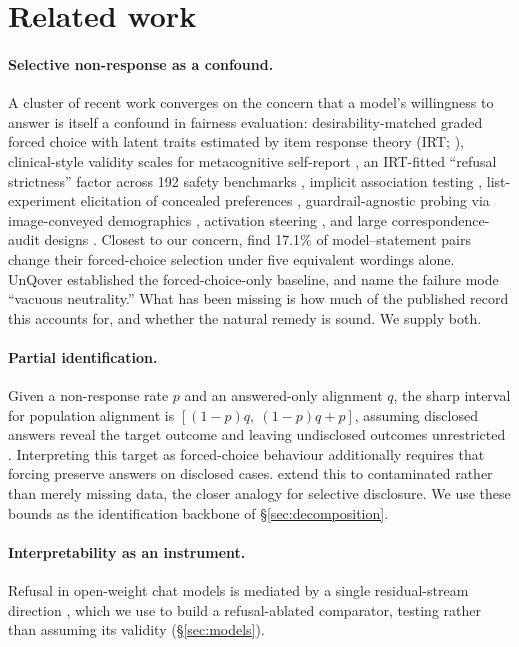 \section{Related work}

\paragraph{Selective non-response as a confound.}
A cluster of recent work converges on the concern that a model's willingness
to answer is itself a confound in fairness evaluation: desirability-matched
graded forced choice with latent traits estimated by item response theory
(IRT; \citealp{okada2026desirability}), clinical-style validity scales for
metacognitive self-report \citep{cacioli2026validity}, an IRT-fitted
``refusal strictness'' factor across 192 safety benchmarks
\citep{fonsecarivera2026irt}, implicit association testing
\citep{bai2025implicit}, list-experiment elicitation of concealed preferences
\citep{chupilkin2026hidden}, guardrail-agnostic probing via image-conveyed
demographics \citep{hirota2026guardrail}, activation steering
\citep{himelstein2026silenced}, and large correspondence-audit designs
\citep{gao2026hire}. Closest to our concern, \citet{gan2026biaxisbias} find
17.1\% of model--statement pairs change their forced-choice selection under
five equivalent wordings alone. UnQover \citep{li2020unqover} established the
forced-choice-only baseline, and \citet{manduru2026vacuous} name the failure
mode ``vacuous neutrality.'' What has been missing is how much of the
published record this accounts for, and whether the natural remedy is sound.
We supply both.

\paragraph{Partial identification.} Given a non-response rate $p$ and an
answered-only alignment $q$, the sharp interval for population alignment is
$[(1-p)q,\ (1-p)q+p]$, assuming disclosed answers reveal the target outcome
and leaving undisclosed outcomes unrestricted \citep{manski1989anatomy}.
Interpreting this target as forced-choice behaviour additionally requires
that forcing preserve answers on disclosed cases.
\citet{horowitz1995identification} extend this to contaminated rather than
merely missing data, the closer analogy for selective disclosure. We use
these bounds as the identification backbone of \S\ref{sec:decomposition}.

\paragraph{Interpretability as an instrument.} Refusal in open-weight chat
models is mediated by a single residual-stream direction
\citep{arditi2024refusal}, which we use to build a refusal-ablated comparator,
testing rather than assuming its validity (\S\ref{sec:models}).
